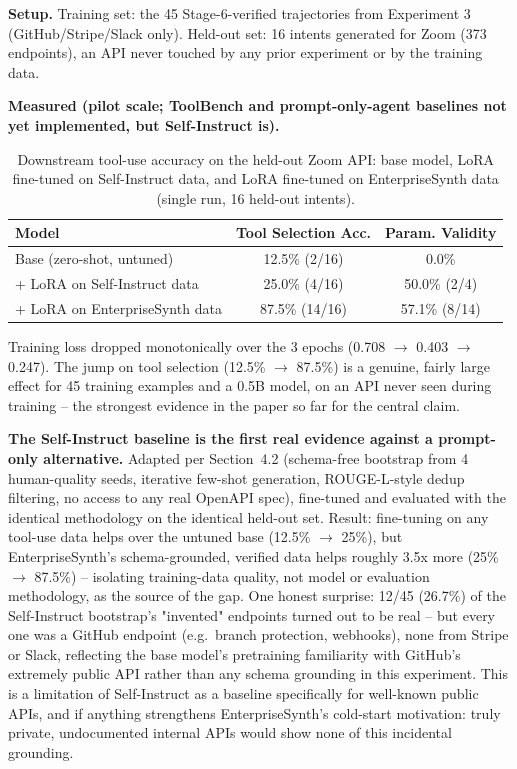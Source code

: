 \documentclass[11pt]{article}
\begin{document}
\textbf{Setup.} Training set: the 45 Stage-6-verified trajectories from Experiment 3
(GitHub/Stripe/Slack only). Held-out set: 16 intents generated for Zoom (373 endpoints), an API
never touched by any prior experiment or by the training data.

\textbf{Measured (pilot scale; ToolBench and prompt-only-agent baselines not yet implemented,
but Self-Instruct is).}

\begin{table}[htbp]
\centering
\footnotesize
\setlength{\tabcolsep}{2pt}
\caption{Downstream tool-use accuracy on the held-out Zoom API: base model, LoRA fine-tuned on
Self-Instruct data, and LoRA fine-tuned on EnterpriseSynth data (single run, 16 held-out intents).}
\label{tab:exp5-zoom}
\begin{tabular}{lcc}
\toprule
\textbf{Model} & \textbf{Tool Selection Acc.} & \textbf{Param. Validity} \\
\midrule
Base (zero-shot, untuned) & 12.5\% (2/16) & 0.0\% \\
+ LoRA on Self-Instruct data & 25.0\% (4/16) & 50.0\% (2/4) \\
+ LoRA on EnterpriseSynth data & 87.5\% (14/16) & 57.1\% (8/14) \\
\bottomrule
\end{tabular}
\end{table}

Training loss dropped monotonically over the 3 epochs (0.708 $\rightarrow$ 0.403 $\rightarrow$
0.247). The jump on tool selection (12.5\% $\rightarrow$ 87.5\%) is a genuine, fairly large effect
for 45 training examples and a 0.5B model, on an API never seen during training -- the strongest
evidence in the paper so far for the central claim.

\textbf{The Self-Instruct baseline is the first real evidence against a prompt-only alternative.} Adapted per Section~4.2
(schema-free bootstrap from 4 human-quality seeds, iterative few-shot generation, ROUGE-L-style
dedup filtering, no access to any real OpenAPI spec), fine-tuned and evaluated with the identical
methodology on the identical held-out set. Result: fine-tuning on any tool-use data helps over the
untuned base (12.5\% $\rightarrow$ 25\%), but EnterpriseSynth's schema-grounded, verified data
helps roughly 3.5x more (25\% $\rightarrow$ 87.5\%) -- isolating training-data quality, not model
or evaluation methodology, as the source of the gap. One honest surprise: 12/45 (26.7\%) of the
Self-Instruct bootstrap's "invented" endpoints turned out to be real -- but every one was a GitHub
endpoint (e.g.\ branch protection, webhooks), none from Stripe or Slack, reflecting the base
model's pretraining familiarity with GitHub's extremely public API rather than any schema
grounding in this experiment. This is a limitation of Self-Instruct as a baseline specifically for
well-known public APIs, and if anything strengthens EnterpriseSynth's cold-start motivation: truly
private, undocumented internal APIs would show none of this incidental grounding.
\end{document}
